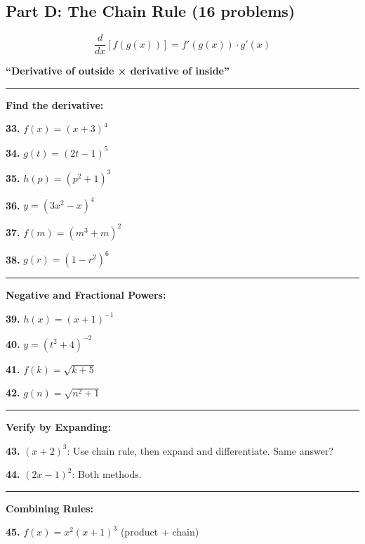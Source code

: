 \documentclass[
  11pt,
]{article}
\begin{document}
\hypertarget{part-d-the-chain-rule-16-problems}{%
\subsection{Part D: The Chain Rule (16
problems)}\label{part-d-the-chain-rule-16-problems}}

\[\frac{d}{dx}[f(g(x))] = f'(g(x)) \cdot g'(x)\]

\textbf{``Derivative of outside × derivative of inside''}

\begin{center}\rule{0.5\linewidth}{0.5pt}\end{center}

\textbf{Find the derivative:}

\textbf{33.} \(f(x) = (x + 3)^4\)

\textbf{34.} \(g(t) = (2t - 1)^5\)

\textbf{35.} \(h(p) = (p^2 + 1)^3\)

\textbf{36.} \(y = (3x^2 - x)^4\)

\textbf{37.} \(f(m) = (m^3 + m)^2\)

\textbf{38.} \(g(r) = (1 - r^2)^6\)

\begin{center}\rule{0.5\linewidth}{0.5pt}\end{center}

\textbf{Negative and Fractional Powers:}

\textbf{39.} \(h(x) = (x + 1)^{-1}\)

\textbf{40.} \(y = (t^2 + 4)^{-2}\)

\textbf{41.} \(f(k) = \sqrt{k + 5}\)

\textbf{42.} \(g(n) = \sqrt{n^2 + 1}\)

\begin{center}\rule{0.5\linewidth}{0.5pt}\end{center}

\textbf{Verify by Expanding:}

\textbf{43.} \((x + 2)^3\): Use chain rule, then expand and
differentiate. Same answer?

\textbf{44.} \((2x - 1)^2\): Both methods.

\begin{center}\rule{0.5\linewidth}{0.5pt}\end{center}

\textbf{Combining Rules:}

\textbf{45.} \(f(x) = x^2(x + 1)^3\) (product + chain)
\end{document}
